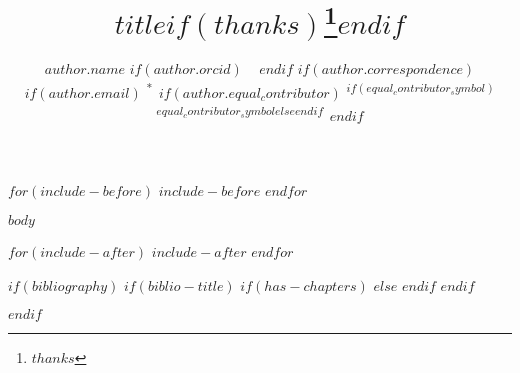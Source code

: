 \documentclass[9pt, twocolumn, toc, lineno]{$documentclass$}
\title{$title$$if(thanks)$\thanks{$thanks$}$endif$}
\author[$for(author.institute_indices)$%
  $author.institute_indices$%
  $sep$,$endfor$]{%
  $author.name$%
  $if(author.orcid)$
  ~\protect\orcid{$author.orcid$}%
  $endif$%
  $if(author.correspondence)$$if(author.email)$%
  \textsuperscript{*\,}%
  $if(author.equal_contributor)$
  \textsuperscript{$if(equal_contributor_symbol)$$equal_contributor_symbol$$else$\textdagger$endif$\,}%
  $endif$%
}
\affil[$institute.index$]{$institute.name$}
\begin{document}
\maketitle

\renewcommand{\figureautorefname}{Fig.}
\renewcommand{\tableautorefname}{Tab.}
\renewcommand{\equationautorefname}{Eq.}

\makeatletter\if@switchSI\else
{}
\fi\makeatother

$for(include-before)$
$include-before$
$endfor$

$body$

$for(include-after)$
$include-after$
$endfor$

$if(bibliography)$
  $if(biblio-title)$
    $if(has-chapters)$
\renewcommand\bibname{$biblio-title$}
    $else$
\renewcommand\refname{$biblio-title$}
    $endif$
  $endif$

$endif$

\end{document}

